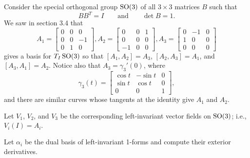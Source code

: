 \documentclass[12pt]{memoir}
\begin{document}
\begin{Ej}
    Consider the special orthogonal group $\operatorname{SO}(3)$ of all $3 \times 3$ matrices $B$ such that 
	\[
		B B^T = I \qquad \text{and} \qquad \det B = 1.
	\]
	We saw in section 3.4 that
	\[
		A_1 = \begin{bmatrix} 0 & 0 & 0 \\ 0 & 0 & -1 \\ 0 & 1 & 0 \end{bmatrix}, A_2 = \begin{bmatrix} 0 & 0 & 1 \\ 0 & 0 & 0 \\ -1 & 0 & 0 \end{bmatrix}, A_3 = \begin{bmatrix} 0 & -1 & 0 \\ 1 & 0 & 0 \\ 0 & 0 & 0 \end{bmatrix}
	\]
	gives a basis for $T_I\operatorname{SO}(3)$ so that $[A_1, A_2]=A_3$, $[A_2,A_3]=A_1$, and $[A_3,A_1]=A_2$. Notice also that $A_3 = \gamma_3'(0)$, where
	\[
		\gamma_3(t) = \begin{bmatrix} \cos t & -\sin t & 0 \\ \sin t & \cos t & 0 \\ 0 & 0 & 1 \end{bmatrix},
	\]
	and there are similar curves whose tangents at the identity give $A_1$ and $A_2$.
	
	Let $V_1$, $V_2$, and $V_3$ be the corresponding left-invariant vector fields on $\operatorname{SO}(3)$; i.e., $V_i(I)=A_i$.
	
	Let $\alpha_i$ be the dual basis of left-invariant 1-forms and compute their exterior derivatives. 
\end{Ej}
\begin{ptcbr}

\end{ptcbr}
\end{document}
